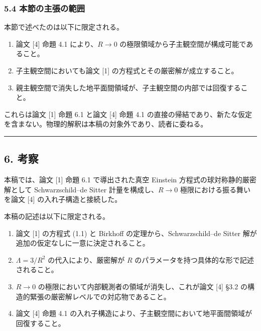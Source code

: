 \documentclass[a4paper,11pt]{ltjsarticle}
\theoremstyle{definition}
\providecommand{\tightlist}{\setlength{\itemsep}{0pt}\setlength{\parskip}{0pt}}
\begin{document}
\subsubsection{5.4
本節の主張の範囲}\label{ux672cux7bc0ux306eux4e3bux5f35ux306eux7bc4ux56f2-1}

本節で述べたのは以下に限定される。

\begin{enumerate}
\def\labelenumi{\arabic{enumi}.}
\tightlist
\item
  論文 {[}4{]} 命題 4.1 により、\(R \to 0\)
  の極限領域から子主観空間が構成可能であること。
\item
  子主観空間においても論文 {[}1{]} の方程式とその厳密解が成立すること。
\item
  親主観空間で消失した地平面間領域が、子主観空間の内部では回復すること。
\end{enumerate}

これらは論文 {[}1{]} 命題 6.1 と論文 {[}4{]} 命題 4.1
の直接の帰結であり、新たな仮定を含まない。物理的解釈は本稿の対象外であり、読者に委ねる。

\begin{center}\rule{0.5\linewidth}{0.5pt}\end{center}

\subsection{6. 考察}\label{ux8003ux5bdf}

本稿では、論文 {[}1{]} 命題 6.1 で導出された真空 Einstein
方程式の球対称静的厳密解として Schwarzschild--de Sitter
計量を構成し、\(R \to 0\) 極限における振る舞いを論文 {[}4{]}
の入れ子構造と接続した。

本稿の記述は以下に限定される。

\begin{enumerate}
\def\labelenumi{\arabic{enumi}.}
\tightlist
\item
  論文 {[}1{]} の方程式 (1.1) と Birkhoff の定理から、Schwarzschild--de
  Sitter 解が追加の仮定なしに一意に決定されること。
\item
  \(\Lambda = 3/R^2\) の代入により、厳密解が \(R\)
  のパラメータを持つ具体的な形で記述されること。
\item
  \(R \to 0\) の極限において内部観測者の領域が消失し、これが論文 {[}4{]}
  §3.2 の構造的緊張の厳密解レベルでの対応物であること。
\item
  論文 {[}4{]} 命題 4.1
  の入れ子構造により、子主観空間において地平面間領域が回復すること。
\end{enumerate}
\end{document}
